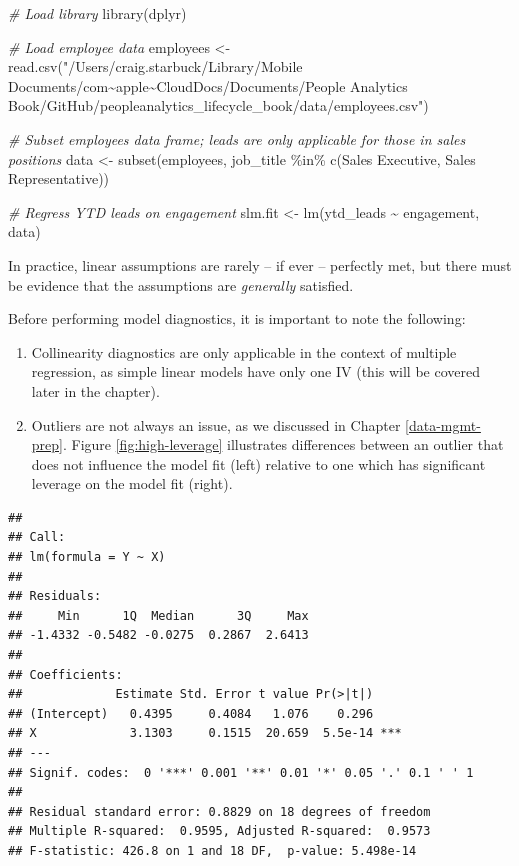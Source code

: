 \documentclass[
]{book}
\newenvironment{Shaded}{\begin{snugshade}}{\end{snugshade}}
\newcommand{\CommentTok}[1]{\textcolor[rgb]{0.56,0.35,0.01}{\textit{#1}}}
\newcommand{\FunctionTok}[1]{\textcolor[rgb]{0.00,0.00,0.00}{#1}}
\newcommand{\NormalTok}[1]{#1}
\newcommand{\OtherTok}[1]{\textcolor[rgb]{0.56,0.35,0.01}{#1}}
\newcommand{\SpecialCharTok}[1]{\textcolor[rgb]{0.00,0.00,0.00}{#1}}
\newcommand{\StringTok}[1]{\textcolor[rgb]{0.31,0.60,0.02}{#1}}
\providecommand{\tightlist}{%
  \setlength{\itemsep}{0pt}\setlength{\parskip}{0pt}}
\begin{document}
\begin{Shaded}
\begin{Highlighting}[]
\CommentTok{\# Load library}
\FunctionTok{library}\NormalTok{(dplyr)}

\CommentTok{\# Load employee data}
\NormalTok{employees }\OtherTok{\textless{}{-}} \FunctionTok{read.csv}\NormalTok{(}\StringTok{"/Users/craig.starbuck/Library/Mobile Documents/com\textasciitilde{}apple\textasciitilde{}CloudDocs/Documents/People Analytics Book/GitHub/peopleanalytics\_lifecycle\_book/data/employees.csv"}\NormalTok{)}

\CommentTok{\# Subset employees data frame; leads are only applicable for those in sales positions}
\NormalTok{data }\OtherTok{\textless{}{-}} \FunctionTok{subset}\NormalTok{(employees, job\_title }\SpecialCharTok{\%in\%} \FunctionTok{c}\NormalTok{(}\StringTok{\textquotesingle{}Sales Executive\textquotesingle{}}\NormalTok{, }\StringTok{\textquotesingle{}Sales Representative\textquotesingle{}}\NormalTok{))}

\CommentTok{\# Regress YTD leads on engagement}
\NormalTok{slm.fit }\OtherTok{\textless{}{-}} \FunctionTok{lm}\NormalTok{(ytd\_leads }\SpecialCharTok{\textasciitilde{}}\NormalTok{ engagement, data)}
\end{Highlighting}
\end{Shaded}

In practice, linear assumptions are rarely -- if ever -- perfectly met, but there must be evidence that the assumptions are \emph{generally} satisfied.

Before performing model diagnostics, it is important to note the following:

\begin{enumerate}
\def\labelenumi{\arabic{enumi}.}
\tightlist
\item
  Collinearity diagnostics are only applicable in the context of multiple regression, as simple linear models have only one IV (this will be covered later in the chapter).
\item
  Outliers are not always an issue, as we discussed in Chapter \ref{data-mgmt-prep}. Figure \ref{fig:high-leverage} illustrates differences between an outlier that does not influence the model fit (left) relative to one which has significant leverage on the model fit (right).
\end{enumerate}

\begin{verbatim}
## 
## Call:
## lm(formula = Y ~ X)
## 
## Residuals:
##     Min      1Q  Median      3Q     Max 
## -1.4332 -0.5482 -0.0275  0.2867  2.6413 
## 
## Coefficients:
##             Estimate Std. Error t value Pr(>|t|)    
## (Intercept)   0.4395     0.4084   1.076    0.296    
## X             3.1303     0.1515  20.659  5.5e-14 ***
## ---
## Signif. codes:  0 '***' 0.001 '**' 0.01 '*' 0.05 '.' 0.1 ' ' 1
## 
## Residual standard error: 0.8829 on 18 degrees of freedom
## Multiple R-squared:  0.9595, Adjusted R-squared:  0.9573 
## F-statistic: 426.8 on 1 and 18 DF,  p-value: 5.498e-14
\end{verbatim}
\end{document}
